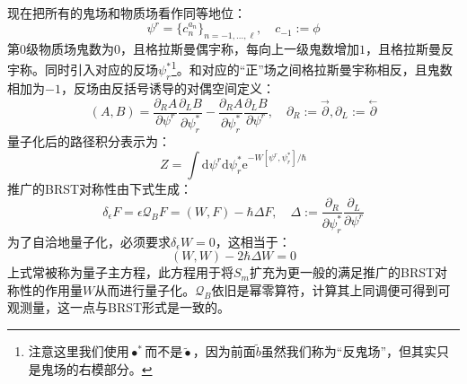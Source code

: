 现在把所有的鬼场和物质场看作同等地位：
\begin{equation}
	\psi^r=\{c_n^{a_n}\}_{n=-1,...,\ell},\quad c_{-1}:=\phi
\end{equation}
第$0$级物质场鬼数为$0$，且格拉斯曼偶宇称，每向上一级鬼数增加$1$，且格拉斯曼反宇称。同时引入对应的反场$\psi^*_r$\footnote{注意这里我们使用$\bullet^*$而不是$\tilde\bullet$，因为前面$\tilde b$虽然我们称为“反鬼场”，但其实只是鬼场的右模部分。}。和对应的“正”场之间格拉斯曼宇称相反，且鬼数相加为$-1$，反场由反括号诱导的对偶空间定义：
\begin{equation}
	(A,B)=\frac{\partial_RA}{\partial\psi^r}\frac{\partial_LB}{\partial\psi_r^*}-\frac{\partial_RA}{\partial\psi_r^*}\frac{\partial_LB}{\partial\psi^r},\quad \partial_R:=\overset{\rightarrow}{\partial},\partial_L:=\overset{\leftarrow}{\partial}
\end{equation}
量子化后的路径积分表示为：
\begin{equation}
	Z=\int\mathrm{d}\psi^r\mathrm{d}\psi_r^*\mathrm{e}^{-W[\psi^r,\psi_r^*]/\hbar}
\end{equation}
推广的BRST对称性由下式生成：
\begin{equation}
	\delta_\epsilon F=\epsilon\mathcal{Q}_B F=(W,F)-\hbar\Delta F,\quad \Delta:=\frac{\partial_R}{\partial\psi_r^*}\frac{\partial_L}{\partial\psi^r}
\end{equation}
为了自洽地量子化，必须要求$\delta_\epsilon W =0$，这相当于：
\begin{equation}
	(W,W)-2\hbar\Delta W=0
\end{equation}
上式常被称为量子主方程，此方程用于将$S_m$扩充为更一般的满足推广的BRST对称性的作用量$W$从而进行量子化。$\mathcal{Q}_B$依旧是幂零算符，计算其上同调便可得到可观测量，这一点与BRST形式是一致的。